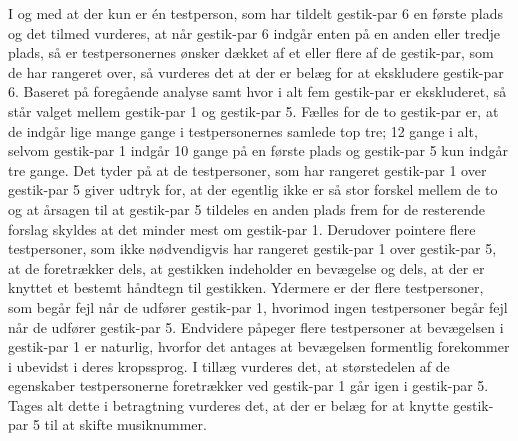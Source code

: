I og med at der kun er én testperson, som har tildelt gestik-par 6 en første plads og det tilmed vurderes, at når gestik-par 6 indgår enten på en anden eller tredje plads, så er testpersonernes ønsker dækket af et eller flere af de gestik-par, som de har rangeret over, så vurderes det at der er belæg for at ekskludere gestik-par 6.\blankline
%
Baseret på foregående analyse samt  hvor i alt fem gestik-par er ekskluderet, så står valget mellem gestik-par 1 og gestik-par 5. Fælles for de to gestik-par er, at de indgår lige mange gange i testpersonernes samlede top tre; 12 gange i alt, selvom gestik-par 1 indgår 10 gange på en første plads og gestik-par 5 kun indgår tre gange. Det tyder på at de testpersoner, som har rangeret gestik-par 1 over gestik-par 5 giver udtryk for, at der egentlig ikke er så stor forskel mellem de to og at årsagen til at gestik-par 5 tildeles en anden plads frem for de resterende forslag skyldes at det minder mest om gestik-par 1. Derudover pointere flere testpersoner, som ikke nødvendigvis har rangeret gestik-par 1 over gestik-par 5, at de foretrækker dels, at gestikken indeholder en bevægelse og dels, at der er knyttet et bestemt håndtegn til gestikken. Ydermere er der flere testpersoner, som begår fejl når de udfører gestik-par 1, hvorimod ingen testpersoner begår fejl når de udfører gestik-par 5. Endvidere påpeger flere testpersoner at bevægelsen i gestik-par 1 er naturlig, hvorfor det antages at bevægelsen formentlig forekommer i ubevidst i deres kropssprog. I tillæg vurderes det, at størstedelen af de egenskaber testpersonerne foretrækker ved gestik-par 1 går igen i gestik-par 5. Tages alt dette i betragtning vurderes det, at der er belæg for at knytte gestik-par 5 til at skifte musiknummer.          

